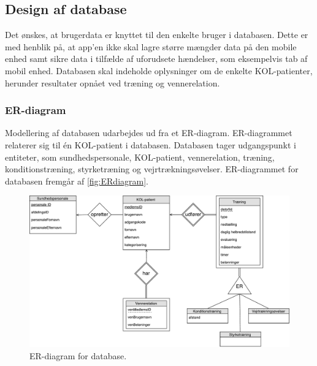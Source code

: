 \subsection{Design af database} \label{sec:ER}
Det ønskes, at brugerdata er knyttet til den enkelte bruger i databasen. Dette er med henblik på, at app'en ikke skal lagre større mængder data på den mobile enhed samt sikre data i tilfælde af uforudsete hændelser, som eksempelvis tab af mobil enhed. Databasen skal indeholde oplysninger om de enkelte KOL-patienter, herunder resultater opnået ved træning og vennerelation. 

\subsubsection{ER-diagram}
Modellering af databasen udarbejdes ud fra et ER-diagram. ER-diagrammet relaterer sig til én KOL-patient i databasen. Databasen tager udgangspunkt i entiteter, som sundhedspersonale, KOL-patient, vennerelation, træning, konditionstræning, styrketræning og vejrtrækningsøvelser. ER-diagrammet for databasen fremgår af \autoref{fig:ERdiagram}.


\begin{figure} [H]
\centering
\includegraphics[width=1\textwidth]{figures/Aktivitetsdiagram/ERdiagram}
\caption{ER-diagram for database.}
\label{fig:ERdiagram}
\end{figure} 


